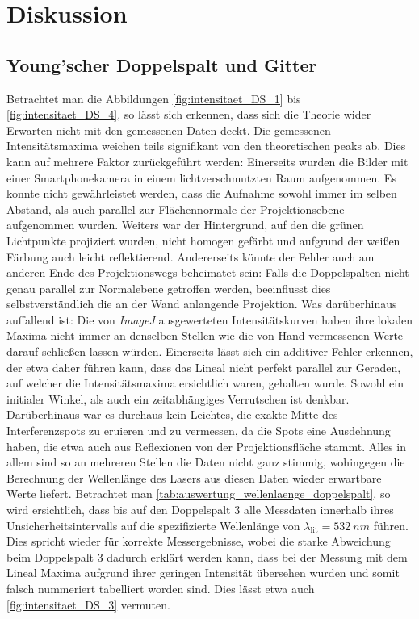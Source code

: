 \documentclass[ngerman]{scrartcl}
\begin{document}
\section{Diskussion}
\label{sec:diskussion}

\subsection{Young'scher Doppelspalt und Gitter}
\label{subsec:diskussion_doppelspalt_gitter_gitter}

Betrachtet man die Abbildungen \ref{fig:intensitaet_DS_1} bis \ref{fig:intensitaet_DS_4}, so lässt sich erkennen, dass sich die Theorie wider Erwarten nicht mit den gemessenen Daten deckt. Die gemessenen Intensitätsmaxima weichen teils signifikant von den theoretischen peaks ab. Dies kann auf mehrere Faktor zurückgeführt werden: Einerseits wurden die Bilder mit einer Smartphonekamera in einem lichtverschmutzten Raum aufgenommen. Es konnte nicht gewährleistet werden, dass die Aufnahme sowohl immer im selben Abstand, als auch parallel zur Flächennormale der Projektionsebene aufgenommen wurden. Weiters war der Hintergrund, auf den die grünen Lichtpunkte projiziert wurden, nicht homogen gefärbt und aufgrund der weißen Färbung auch leicht reflektierend. Andererseits könnte der Fehler auch am anderen Ende des Projektionswegs beheimatet sein: Falls die Doppelspalten nicht genau parallel zur Normalebene getroffen werden, beeinflusst dies selbstverständlich die an der Wand anlangende Projektion. Was darüberhinaus auffallend ist: Die von \textit{ImageJ} ausgewerteten Intensitätskurven haben ihre lokalen Maxima nicht immer an denselben Stellen wie die von Hand vermessenen Werte darauf schließen lassen würden. Einerseits lässt sich ein additiver Fehler erkennen, der etwa daher führen kann, dass das Lineal nicht perfekt parallel zur Geraden, auf welcher die Intensitätsmaxima ersichtlich waren, gehalten wurde. Sowohl ein initialer Winkel, als auch ein zeitabhängiges Verrutschen ist denkbar. Darüberhinaus war es durchaus kein Leichtes, die exakte Mitte des Interferenzspots zu eruieren und zu vermessen, da die Spots eine Ausdehnung haben, die etwa auch aus Reflexionen von der Projektionsfläche stammt. Alles in allem sind so an mehreren Stellen die Daten nicht ganz stimmig, wohingegen die Berechnung der Wellenlänge des Lasers aus diesen Daten wieder erwartbare Werte liefert. Betrachtet man \autoref{tab:auswertung_wellenlaenge_doppelspalt}, so wird ersichtlich, dass bis auf den Doppelspalt 3 alle Messdaten innerhalb ihres Unsicherheitsintervalls auf die spezifizierte Wellenlänge von $\lambda_{\text{lit}}=\SI{532}{nm}$ führen. Dies spricht wieder für korrekte Messergebnisse, wobei die starke Abweichung beim Doppelspalt 3 dadurch erklärt werden kann, dass bei der Messung mit dem Lineal Maxima aufgrund ihrer geringen Intensität übersehen wurden und somit falsch nummeriert tabelliert worden sind. Dies lässt etwa auch \autoref{fig:intensitaet_DS_3} vermuten.
\end{document}

